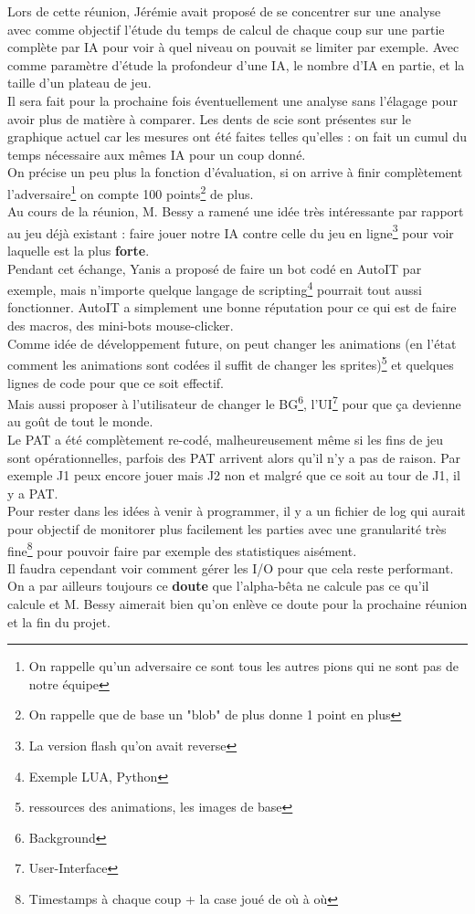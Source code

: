 \documentclass[11pt,a4paper]{article}
\begin{document}
    Lors de cette réunion, Jérémie avait proposé de se concentrer sur une analyse avec comme objectif l'étude du temps de calcul de chaque coup sur une partie complète par IA pour voir à quel niveau on pouvait se limiter par exemple. Avec comme paramètre d'étude la profondeur d'une IA, le nombre d'IA en partie, et la taille d'un plateau de jeu.\\
    Il sera fait pour la prochaine fois éventuellement une analyse sans l'élagage pour avoir plus de matière à comparer.
    Les dents de scie sont présentes sur le graphique actuel car les mesures ont été faites telles qu'elles : on fait un cumul du temps nécessaire aux mêmes IA pour un coup donné.\\
    On précise un peu plus la fonction d'évaluation, si on arrive à finir complètement l'adversaire\footnote{On rappelle qu'un adversaire ce sont tous les autres pions qui ne sont pas de notre équipe} on compte 100 points\footnote{On rappelle que de base un "blob" de plus donne 1 point en plus} de plus. \\
    Au cours de la réunion, M. Bessy a ramené une idée très intéressante par rapport au jeu déjà existant : faire jouer notre IA contre celle du jeu en ligne\footnote{La version flash qu'on avait reverse} pour voir laquelle est la plus \textbf{forte}.\\
    Pendant cet échange, Yanis a proposé de faire un bot codé en AutoIT par exemple, mais n'importe quelque langage de scripting\footnote{Exemple LUA, Python} pourrait tout aussi fonctionner. AutoIT a simplement une bonne réputation pour ce qui est de faire des macros, des mini-bots mouse-clicker.\\
    Comme idée de développement future, on peut changer les animations (en l'état comment les animations sont codées il suffit de changer les sprites)\footnote{ressources des animations, les images de base} et quelques lignes de code pour que ce soit effectif.\\
    Mais aussi proposer à l'utilisateur de changer le BG\footnote{Background}, l'UI\footnote{User-Interface} pour que ça devienne au goût de tout le monde.\\
    Le PAT a été complètement re-codé, malheureusement même si les fins de jeu sont opérationnelles, parfois des PAT arrivent alors qu'il n'y a pas de raison.
    Par exemple J1 peux encore jouer mais J2 non et malgré que ce soit au tour de J1, il y a PAT.\\
    Pour rester dans les idées à venir à programmer, il y a un fichier de log qui aurait pour objectif de monitorer plus facilement les parties avec une granularité très fine\footnote{Timestamps à chaque coup + la case joué de où à où} pour pouvoir faire par exemple des statistiques aisément.\\
    Il faudra cependant voir comment gérer les I/O pour que cela reste performant.\\
    On a par ailleurs toujours ce \textbf{doute} que l'alpha-bêta ne calcule pas ce qu'il calcule et M. Bessy aimerait bien qu'on enlève ce doute pour la prochaine réunion et la fin du projet.\\
    
\end{document}
